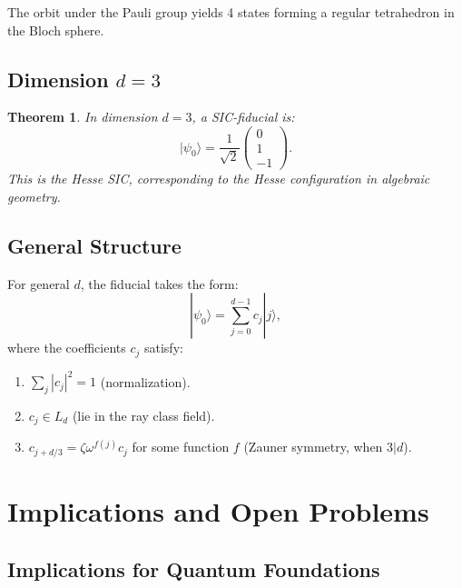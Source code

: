 \documentclass[a4paper,11pt]{article}
\newtheorem{theorem}{Theorem}[section]
\begin{document}
The orbit under the Pauli group yields 4 states forming a regular tetrahedron in the Bloch sphere.

\subsection{Dimension $d = 3$}

\begin{theorem}
In dimension $d=3$, a SIC-fiducial is:
\begin{equation}
|\psi_0\rangle = \frac{1}{\sqrt{2}}\begin{pmatrix}
0 \\ 1 \\ -1
\end{pmatrix}.
\end{equation}
This is the Hesse SIC, corresponding to the Hesse configuration in algebraic geometry.
\end{theorem}

\subsection{General Structure}

For general $d$, the fiducial takes the form:
\begin{equation}
|\psi_0\rangle = \sum_{j=0}^{d-1} c_j |j\rangle,
\end{equation}
where the coefficients $c_j$ satisfy:
\begin{enumerate}
    \item $\sum_j |c_j|^2 = 1$ (normalization).
    \item $c_j \in L_d$ (lie in the ray class field).
    \item $c_{j+d/3} = \zeta \omega^{f(j)} c_j$ for some function $f$ (Zauner symmetry, when $3|d$).
\end{enumerate}

\section{Implications and Open Problems}

\subsection{Implications for Quantum Foundations}
\end{document}
